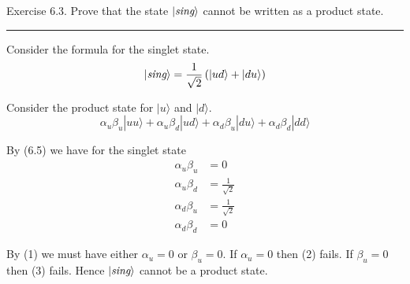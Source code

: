 \documentclass[12pt]{article}
\begin{document}
Exercise 6.3.
Prove that the state $|\text{\it sing}\rangle$ cannot be written
as a product state.

\bigskip
\hrule

\bigskip
Consider the formula for the singlet state.
\begin{equation*}
|\text{\it sing}\rangle=\frac{1}{\sqrt2}\left(|ud\rangle+|du\rangle\right)
\end{equation*}

Consider the product state for $|u\rangle$ and $|d\rangle$.
\begin{equation*}
\alpha_u\beta_u|uu\rangle
+\alpha_u\beta_d|ud\rangle
+\alpha_d\beta_u|du\rangle
+\alpha_d\beta_d|dd\rangle
\tag{6.5}
\end{equation*}

By (6.5) we have for the singlet state
\begin{align*}
\alpha_u\beta_u&=0\tag{1}
\\[1ex]
\alpha_u\beta_d&=\frac{1}{\sqrt2}\tag{2}
\\[1ex]
\alpha_d\beta_u&=\frac{1}{\sqrt2}\tag{3}
\\[1ex]
\alpha_d\beta_d&=0\tag{4}
\end{align*}

By (1) we must have either $\alpha_u=0$ or $\beta_u=0$.
If $\alpha_u=0$ then (2) fails.
If $\beta_u=0$ then (3) fails.
Hence $|\text{\it sing}\rangle$ cannot be a product state.
\end{document}
